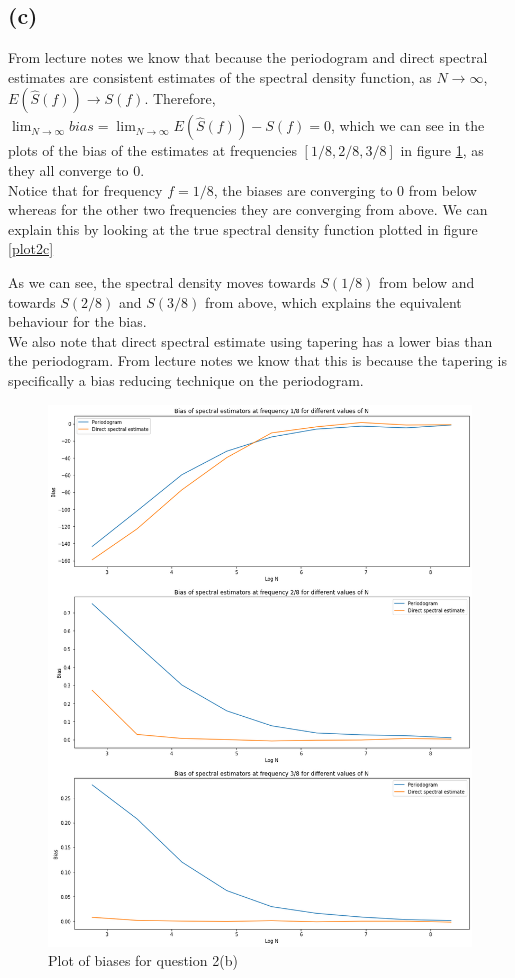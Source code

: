 \documentclass[a4paper,10pt]{article}
\theoremstyle{mytheor}
\begin{document}
\subsection*{(c)}

From lecture notes we know that because the periodogram and direct spectral estimates are consistent estimates of the spectral density function, as $N \rightarrow \infty$, $E(\hat{S}(f)) \rightarrow S(f)$. Therefore, $\lim_{N\rightarrow \infty}bias = \lim_{N\rightarrow \infty}E(\hat{S}(f)) - S(f) = 0 $, which we can see in the plots of the bias of the estimates at frequencies $[1/8, 2/8, 3/8]$ in figure \ref{plot2b}, as they all converge to 0.\\

Notice that for frequency $f = 1/8$, the biases are converging to 0 from below whereas for the other two frequencies they are converging from above. We can explain this by looking at the true spectral density function plotted in figure \ref{plot2c}

As we can see, the spectral density moves towards $S(1/8)$ from below and towards $S(2/8)$ and $S(3/8)$ from above, which explains the equivalent behaviour for the bias.\\

We also note that direct spectral estimate using tapering has a lower bias than the periodogram. From lecture notes we know that this is because the tapering is specifically a bias reducing technique on the periodogram.
\begin{figure}
    \centering
    \includegraphics[width=0.9\columnwidth]{plot2b.png}
    \caption{Plot of biases for question 2(b)}
    \label{plot2b}
\end{figure}
\end{document}
